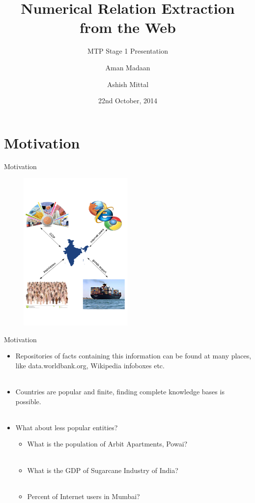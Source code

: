 \documentclass{beamer}
\title{Numerical Relation Extraction from the Web}
\subtitle{MTP Stage 1 Presentation}
\author[]{Aman Madaan \and Ashish Mittal}
\institute[]{
  Indian Institute of Technology Bombay, Mumbai
}
\date{22nd October, 2014}
\begin{document}
\maketitle
\section{Motivation}

\begin{frame}{Motivation}

    \begin{figure}
    \centering
    \includegraphics[width = 0.5\textwidth]{images/motivation}
  \end{figure}
 
\end{frame}
\begin{frame}{Motivation}
 
 \begin{itemize}
  \item Repositories of facts containing this information can be found at many places, like data.worldbank.org, Wikipedia infoboxes etc. \pause \\~\\
  \item Countries are popular and finite, finding complete knowledge bases is possible. \pause \\~\\
  \item What about less popular entities?  \pause 
    \begin{itemize}
      \item What is the population of Arbit Apartments, Powai? \pause \\~\\
      \item What is the GDP of Sugarcane Industry of India? \pause \\~\\
      \item Percent of Internet users in Mumbai? 
    \end{itemize}
 \end{itemize} 
\end{frame}
\end{document}
